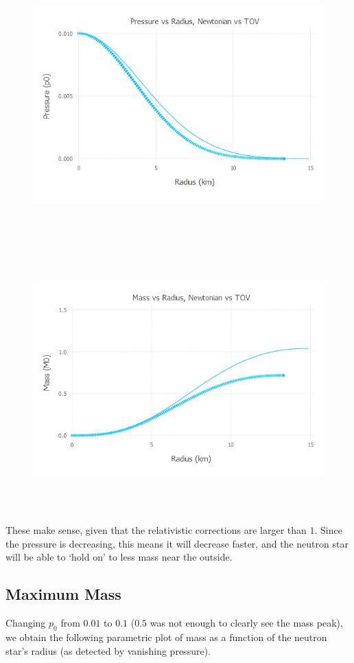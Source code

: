 \documentclass{article}
\begin{document}
\begin{figure}[H]
	\includegraphics[width=6in,height=4in]{"pvr"}
\end{figure}
\begin{figure}[H]
	\includegraphics[width=6in,height=4in]{"mvr"}
\end{figure}

These make sense, given that the relativistic corrections are larger than $1$. Since the pressure is decreasing, this means it will decrease faster, and the neutron star will be able to `hold on' to less mass near the outside.

\subsection{Maximum Mass}
Changing $p_0$ from $0.01$ to $0.1$ ($0.5$ was not enough to clearly see the mass peak), we obtain the following parametric plot of mass as a function of the neutron star's radius (as detected by vanishing pressure).
\end{document}
